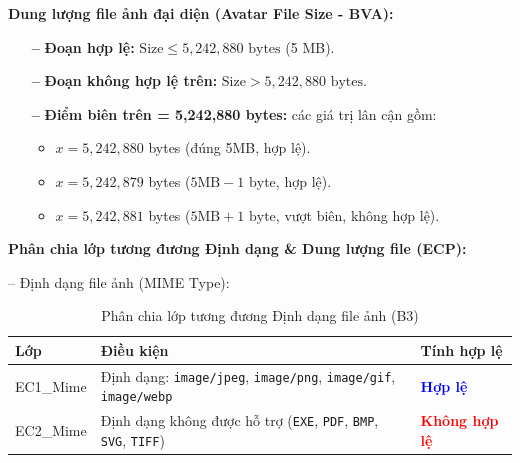 \documentclass[11pt,a4paper]{article}
\begin{document}
\noindent\textbf{Dung lượng file ảnh đại diện (Avatar File Size - BVA):}
\begin{figure}[H]
\centering
{}
\end{figure}
\begin{itemize}[leftmargin=1.2cm, noitemsep]
    \item[\textbf{--}] \textbf{Đoạn hợp lệ:} $\text{Size} \le 5,242,880\text{ bytes}$ (5 MB).
    \item[\textbf{--}] \textbf{Đoạn không hợp lệ trên:} $\text{Size} > 5,242,880\text{ bytes}$.
    \item[\textbf{--}] \textbf{Điểm biên trên = 5,242,880 bytes:} các giá trị lân cận gồm:
    \begin{itemize}[leftmargin=0.8cm, label=$\bullet$, noitemsep]
        \item $x = 5,242,880$ bytes (đúng 5MB, hợp lệ).
        \item $x = 5,242,879$ bytes ($\text{5MB} - 1\text{ byte}$, hợp lệ).
        \item $x = 5,242,881$ bytes ($\text{5MB} + 1\text{ byte}$, vượt biên, không hợp lệ).
    \end{itemize}
\end{itemize}

\noindent\textbf{Phân chia lớp tương đương Định dạng \& Dung lượng file (ECP):}

\noindent -- Định dạng file ảnh (MIME Type):
\begin{table}[H]
\centering
\small
\begin{tabularx}{\textwidth}{|L{3.0cm}|X|C{3.2cm}|}
\hline
{}
\textbf{Lớp} & \textbf{Điều kiện} & \textbf{Tính hợp lệ} \tabularnewline
\hline
EC1\_Mime & Định dạng: \texttt{image/jpeg}, \texttt{image/png}, \texttt{image/gif}, \texttt{image/webp} & \textcolor{blue}{\textbf{Hợp lệ}} \\ \hline
EC2\_Mime & Định dạng không được hỗ trợ (\texttt{EXE}, \texttt{PDF}, \texttt{BMP}, \texttt{SVG}, \texttt{TIFF}) & \textcolor{red}{\textbf{Không hợp lệ}} \\ \hline
\end{tabularx}
\caption{Phân chia lớp tương đương Định dạng file ảnh (B3)}
\end{table}
\end{document}

